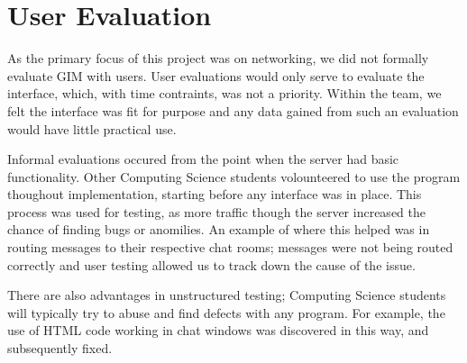 \section{User Evaluation}
\label{user_eval}

As the primary focus of this project was on networking, we did not formally evaluate GIM with users. User evaluations would only serve to evaluate the interface, which, with time contraints, was not a priority. Within the team, we felt the interface was fit for purpose and any data gained from such an evaluation would have little practical use.

Informal evaluations occured from the point when the server had basic functionality. Other Computing Science students volounteered to use the program thoughout implementation, starting before any interface was in place. This process was used for testing, as more traffic though the server increased the chance of finding bugs or anomilies. An example of where this helped was in routing messages to their respective chat rooms; messages were not being routed correctly and user testing allowed us to track down the cause of the issue.

There are also advantages in unstructured testing; Computing Science students will typically try to abuse and find defects with any program. For example, the use of HTML code working in chat windows was discovered in this way, and subsequently fixed.
